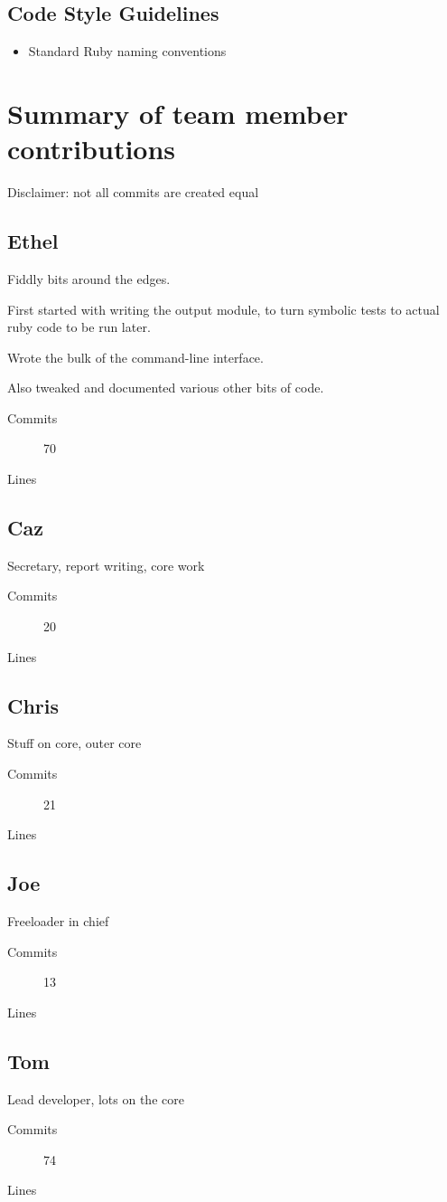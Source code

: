   \subsection{Code Style Guidelines}
    \begin{itemize}
      \item Standard Ruby naming conventions
    \end{itemize}


\section{Summary of team member contributions}
Disclaimer: not all commits are created equal

  \subsection{Ethel}
    Fiddly bits around the edges.

    First started with writing the output module, to turn symbolic tests to actual ruby code to be run later.

    Wrote the bulk of the command-line interface.

    Also tweaked and documented various other bits of code.
    \begin{description}
      \item[Commits] 70
      \item[Lines]
    \end{description}

  \subsection{Caz}
    Secretary, report writing, core work
    \begin{description}
      \item[Commits] 20
      \item[Lines]
    \end{description}

  \subsection{Chris}
    Stuff on core, outer core
    \begin{description}
      \item[Commits] 21
      \item[Lines]
    \end{description}

  \subsection{Joe}
    Freeloader in chief
    \begin{description}
      \item[Commits] 13
      \item[Lines]
    \end{description}

  \subsection{Tom}
    Lead developer, lots on the core
    \begin{description}
      \item[Commits] 74
      \item[Lines]
    \end{description}
